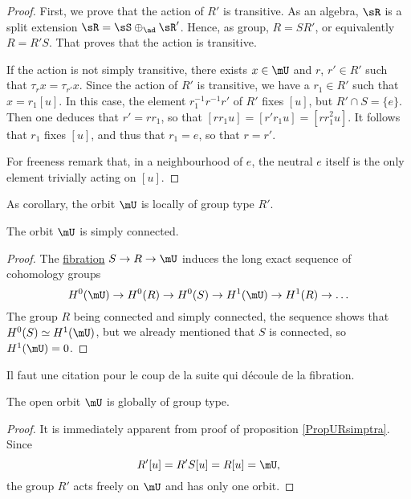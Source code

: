 \begin{proof}

First, we prove that the action of $R'$ is transitive. As an algebra, $\sR$ is a split extension $\sR=\sS\oplus_{\ad}\sR'$.  Hence, as group, $R=S R'$, or equivalently $R=R'S$. That proves that the action is transitive.  

If the action is not simply transitive, there exists $x\in\mU$ and $r$, $r'\in R'$ such that $\tau_rx=\tau_{r'}x$. Since the action of $R'$ is transitive, we have a $r_1\in R'$ such that $x=r_1[u]$. In this case, the element $r_1^{-1}r^{-1}r'$ of $R'$ fixes $[u]$, but $R'\cap S=\{ e \}$. Then one deduces that $r'=rr_1$, so that $[rr_1u]=[r'r_1u]=[rr_1^2u]$. It follows that $r_1$ fixes $[u]$, and thus that $r_1=e$, so that $r=r'$.

For freeness remark that, in a neighbourhood of $e$, the neutral $e$ itself is the only element trivially acting on $[u]$.

\end{proof}

As corollary, the orbit $\mU$ is locally of group type $R'$.

\begin{proposition}     \label{PropmUsimpl}
The orbit $\mU$ is simply connected.
\end{proposition}

\begin{proof}
    The \href{http://en.wikipedia.org/wiki/Fibration}{fibration} $S\to R\to\mU$ induces the long exact sequence of cohomology groups
    \[ 
      H^{0}(\mU)\to H^{0}(R)\to H^{0}(S)\to H^{1}(\mU)\to H^{1}(R)\to\ldots
    \]
    The group $R$ being connected and simply connected, the sequence shows that $H^{0}(S)\simeq H^{1}(\mU)$, but we already mentioned that $S$ is connected, so $H^1(\mU)=0$.
\end{proof}

\begin{probleme}
Il faut une citation pour le coup de la suite qui découle de la fibration.
\label{ProbFibra}
\end{probleme}


\begin{corollary}
The open orbit $\mU$ is globally of group type.
\label{CormUgloGppasSym}
\end{corollary}

\begin{proof}
It is immediately apparent from proof of proposition \ref{PropURsimptra}. Since
\[ 
  R'[u]=R'S[u]=R[u]=\mU,
\]
the group $R'$ acts freely on $\mU$ and has only one orbit.
\end{proof}

